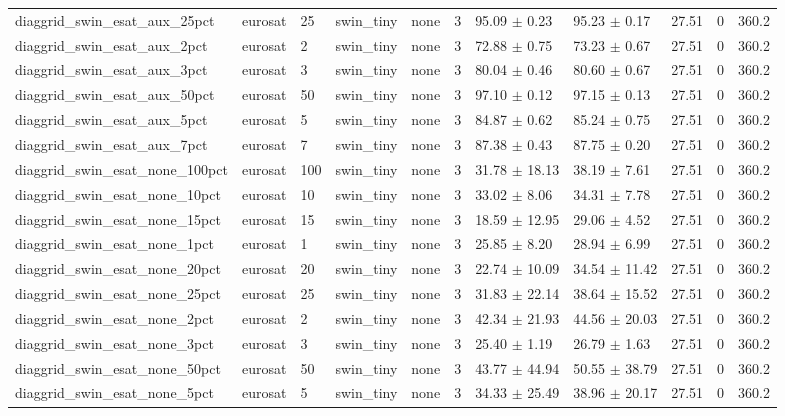 \begin{tabular}{lllllllllll}
diaggrid_swin_esat_aux_25pct & eurosat & 25 & swin_tiny & none & 3 & 95.09 $\pm$ 0.23 & 95.23 $\pm$ 0.17 & 27.51 & 0 & 360.2 \\
diaggrid_swin_esat_aux_2pct & eurosat & 2 & swin_tiny & none & 3 & 72.88 $\pm$ 0.75 & 73.23 $\pm$ 0.67 & 27.51 & 0 & 360.2 \\
diaggrid_swin_esat_aux_3pct & eurosat & 3 & swin_tiny & none & 3 & 80.04 $\pm$ 0.46 & 80.60 $\pm$ 0.67 & 27.51 & 0 & 360.2 \\
diaggrid_swin_esat_aux_50pct & eurosat & 50 & swin_tiny & none & 3 & 97.10 $\pm$ 0.12 & 97.15 $\pm$ 0.13 & 27.51 & 0 & 360.2 \\
diaggrid_swin_esat_aux_5pct & eurosat & 5 & swin_tiny & none & 3 & 84.87 $\pm$ 0.62 & 85.24 $\pm$ 0.75 & 27.51 & 0 & 360.2 \\
diaggrid_swin_esat_aux_7pct & eurosat & 7 & swin_tiny & none & 3 & 87.38 $\pm$ 0.43 & 87.75 $\pm$ 0.20 & 27.51 & 0 & 360.2 \\
diaggrid_swin_esat_none_100pct & eurosat & 100 & swin_tiny & none & 3 & 31.78 $\pm$ 18.13 & 38.19 $\pm$ 7.61 & 27.51 & 0 & 360.2 \\
diaggrid_swin_esat_none_10pct & eurosat & 10 & swin_tiny & none & 3 & 33.02 $\pm$ 8.06 & 34.31 $\pm$ 7.78 & 27.51 & 0 & 360.2 \\
diaggrid_swin_esat_none_15pct & eurosat & 15 & swin_tiny & none & 3 & 18.59 $\pm$ 12.95 & 29.06 $\pm$ 4.52 & 27.51 & 0 & 360.2 \\
diaggrid_swin_esat_none_1pct & eurosat & 1 & swin_tiny & none & 3 & 25.85 $\pm$ 8.20 & 28.94 $\pm$ 6.99 & 27.51 & 0 & 360.2 \\
diaggrid_swin_esat_none_20pct & eurosat & 20 & swin_tiny & none & 3 & 22.74 $\pm$ 10.09 & 34.54 $\pm$ 11.42 & 27.51 & 0 & 360.2 \\
diaggrid_swin_esat_none_25pct & eurosat & 25 & swin_tiny & none & 3 & 31.83 $\pm$ 22.14 & 38.64 $\pm$ 15.52 & 27.51 & 0 & 360.2 \\
diaggrid_swin_esat_none_2pct & eurosat & 2 & swin_tiny & none & 3 & 42.34 $\pm$ 21.93 & 44.56 $\pm$ 20.03 & 27.51 & 0 & 360.2 \\
diaggrid_swin_esat_none_3pct & eurosat & 3 & swin_tiny & none & 3 & 25.40 $\pm$ 1.19 & 26.79 $\pm$ 1.63 & 27.51 & 0 & 360.2 \\
diaggrid_swin_esat_none_50pct & eurosat & 50 & swin_tiny & none & 3 & 43.77 $\pm$ 44.94 & 50.55 $\pm$ 38.79 & 27.51 & 0 & 360.2 \\
diaggrid_swin_esat_none_5pct & eurosat & 5 & swin_tiny & none & 3 & 34.33 $\pm$ 25.49 & 38.96 $\pm$ 20.17 & 27.51 & 0 & 360.2 \\

\end{tabular}
